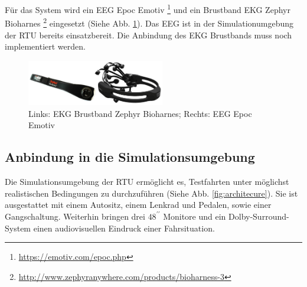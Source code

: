 {Für das System wird ein EEG Epoc Emotiv \footnote{\url{https://emotiv.com/epoc.php}} und ein Brustband EKG Zephyr Bioharnes \footnote{\url{http://www.zephyranywhere.com/products/bioharness-3}} eingesetzt (Siehe Abb. \ref{fig:sensors}). Das EEG ist in der Simulationumgebung der \acl{RTU} bereits einsatzbereit. Die Anbindung des EKG Brustbands muss noch implementiert werden.

\begin{figure}[h] 
  \begin{center}
    \includegraphics[width=6cm]{img/sensors}
    \caption{Links: EKG Brustband Zephyr Bioharnes; Rechts: EEG Epoc Emotiv}
    \label{fig:sensors}
  \end{center}
\end{figure}

\subsection{Anbindung in die Simulationsumgebung}
\label{subsec:sim}
Die Simulationsumgebung der \acl{RTU} ermöglicht es, Testfahrten unter möglichst realistischen Bedingungen zu durchzuführen (Siehe Abb. \ref{fig:architecure}). Sie ist ausgestattet mit einem Autositz, einem Lenkrad und Pedalen, sowie einer Gangschaltung. Weiterhin bringen drei $48^{\prime\prime}$ Monitore und ein Dolby-Surround-System einen audiovisuellen Eindruck einer Fahrsituation.\\

}

